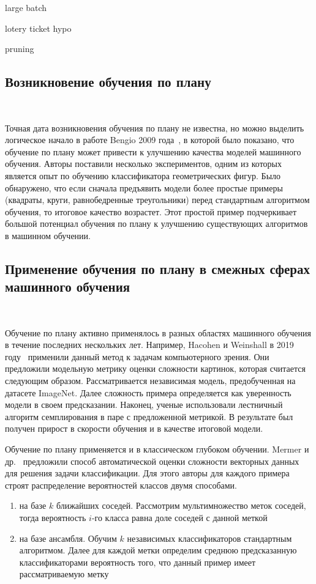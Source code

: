 \documentclass{spbau-diploma}
\begin{document}
large batch

lotery ticket hypo

pruning
	
\subsection{Возникновение обучения по плану}
\ 

Точная дата возникновения обучения по плану не известна, но можно выделить логическое начало в работе Bengio 2009 года~\cite{bengio2009curriculum}, в которой было показано, что обучение по плану может привести к улучшению качества моделей машинного обучения. Авторы поставили несколько экспериментов, одним из которых является опыт по обучению классификатора геометрических фигур. Было обнаружено, что если сначала предъявить модели более простые примеры (квадраты, круги, равнобедренные треугольники) перед стандартным алгоритмом обучения, то итоговое качество возрастет. Этот простой пример подчеркивает большой потенциал обучения по плану к улучшению существующих алгоритмов в машинном обучении.
\subsection{Применение обучения по плану в смежных сферах машинного обучения}
\ 

Обучение по плану активно применялось в разных областях машинного обучения в течение последних нескольких лет. Например, Hacohen и Weinshall в 2019 году~\cite{hacohen2019power} применили данный метод к задачам компьютерного зрения. Они предложили модельную метрику оценки сложности картинок, которая считается следующим образом. Рассматривается независимая модель, предобученная на датасете ImageNet. Далее сложность примера определяется как уверенность модели в своем предсказании. Наконец, ученые использовали лестничный алгоритм семплирования в паре с предложенной метрикой. В результате был получен прирост в скорости обучения и в качестве итоговой модели.

Обучение по плану применяется и в классическом глубоком обучении. Mermer и др.~\cite{mermer2017scalable} предложили способ автоматической оценки сложности векторных данных для решения задачи классификации. Для этого авторы для каждого примера строят распределение вероятностей классов двумя способами.
\begin{enumerate}
	\item на базе $k$ ближайших соседей. Рассмотрим мультимножество меток соседей, тогда вероятность $i$-го класса равна доле соседей с данной меткой
	\item на базе ансамбля. Обучим $k$ независимых классификаторов стандартным алгоритмом. Далее для каждой метки определим среднюю предсказанную классификаторами вероятность того, что данный пример имеет рассматриваемую метку
\end{enumerate}
	
\end{document}
